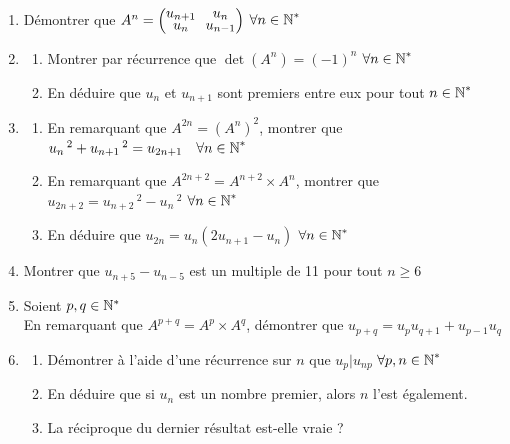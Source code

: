 \documentclass[oneside,12pt]{book}          %
\begin{document}
\begin{enumerate}\setlength{\itemsep}{1mm}
    \item Démontrer que $A^n=\matrice{u_{n+1}&u_n\\u_n&u_{n-1}}$ \quad $\forall{n\in\mathbb N}^*$
    \item \begin{enumerate}
        \item Montrer par récurrence que $\det(A^n)=(-1)^n$ \quad $\forall{n\in\mathbb N}^*$
        \item En déduire que $u_n$ et $u_{n+1}$ sont premiers entre eux pour tout ${n\in\mathbb N}^*$
    \end{enumerate}
    \item \begin{enumerate}
        \item En remarquant que $A^{2n}= \left(A^n\right)^2$, montrer que $u_n\,^2+u_{n+1}\,^2=u_{2n+1}\quad\forall{n\in\mathbb N}^*$
        \item En remarquant que $A^{2n+2}=A^{n+2}\times A^n$, montrer que $u_{2n+2}=u_{n+2}\,^2-u_n\,^2$ \quad $\forall{n\in\mathbb N}^*$
        \item En déduire que $u_{2n}=u_n(2u_{n+1}-u_n)$ \quad $\forall{n\in\mathbb N}^*$
    \end{enumerate}
    \item Montrer que $u_{n+5}-u_{n-5}$ est un multiple de 11 pour tout $n\geq6$
    \item Soient $p,q\in{\mathbb N}^*$\\
    En remarquant que $A^{p+q}=A^p\times A^q$, démontrer que $u_{p+q}=u_pu_{q+1}+u_{p-1}u_q$
    \item \begin{enumerate}
        \item Démontrer à l'aide d'une récurrence sur $n$ que $u_p|u_{np}$ \quad $\forall p,{n\in\mathbb N}^*$
        \item En déduire que si $u_n$ est un nombre premier, alors $n$ l'est également.
        \item La réciproque du dernier résultat est-elle vraie ?
    \end{enumerate}
\end{enumerate}


\end{document}

